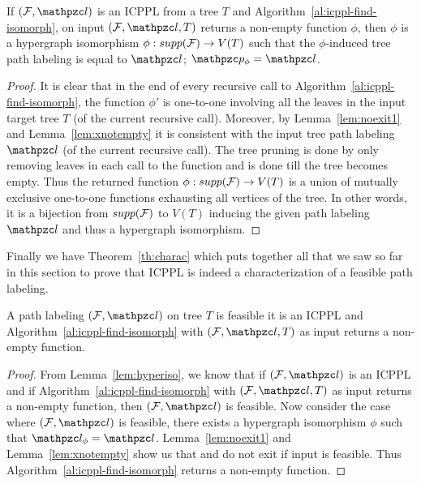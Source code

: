 \begin{lemma}
  \label{lem:hyperiso} %
  If $(\cF, \cl)$ is an ICPPL from a tree $T$ and
  Algorithm~\ref{al:icppl-find-isomorph}, on input $(\cF, \cl, T)$
  returns a non-empty function $\phi$, then $\phi$ is a hypergraph
  isomorphism $\phi : supp({\cal F}) \rightarrow V(T)$ such that the
  $\phi$-induced tree path labeling is equal to $\cl$; $\cp_\phi =
  \cl$.
\end{lemma}
\begin{proof}\thesisspacing
  It is clear that in the end of every recursive call to
  Algorithm~\ref{al:icppl-find-isomorph}, the function $\phi'$ is
  one-to-one involving all the leaves in the input target tree $T$ (of
  the current recursive call). Moreover, by Lemma~\ref{lem:noexit1}
  and Lemma~\ref{lem:xnotempty} it is consistent with the input tree
  path labeling $\cl$ (of the current recursive call). The tree
  pruning is done by only removing leaves in each call to the function
  and is done till the tree becomes empty. Thus the returned function
  $\phi: supp({\cal F}) \rightarrow V(T)$ is a union of mutually exclusive
  one-to-one functions exhausting all vertices of the tree. In other
  words, it is a bijection from $supp({\cal F})$ to $V(T)$ inducing the
  given path labeling $\cl$ and thus a hypergraph isomorphism. %
\end{proof}

Finally we have Theorem~\ref{th:charac} which puts together all that
we saw so far in this section to prove that ICPPL is indeed a
characterization of a feasible path labeling.
\begin{theorem}
  \label{th:charac}
  A path labeling $(\cF, \cl)$ on tree $T$ is feasible \iff it is an
  ICPPL and Algorithm~\ref{al:icppl-find-isomorph} with $(\cF, \cl,
  T)$ as input returns a non-empty function.
\end{theorem}
\begin{proof}\thesisspacing
  From Lemma~\ref{lem:hyperiso}, we know that if $(\cF, \cl)$ is an
  ICPPL and if Algorithm~\ref{al:icppl-find-isomorph} with $(\cF, \cl,
  T)$ as input returns a non-empty function, then $(\cF, \cl)$ is
  feasible.  Now consider the case where $(\cF, \cl)$ is feasible, \ie
  there exists a hypergraph isomorphism $\phi$ such that $\cl_\phi =
  \cl$. Lemma~\ref{lem:noexit1} and Lemma~\ref{lem:xnotempty} show us
  that \filteri and \filterii do not exit if input is feasible. Thus
  Algorithm~\ref{al:icppl-find-isomorph} returns a non-empty
  function.%
\end{proof}


